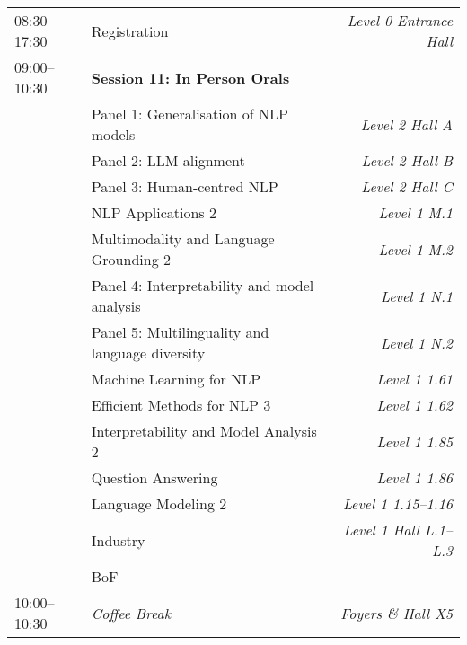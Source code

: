 \begin{xltabular}{\linewidth}{l X r}
    08:30--17:30    &   Registration    &   \textit{Level 0 Entrance Hall} \\
    
    09:00--10:30    &   \textbf{Session 11: In Person Orals} & \\
    &   Panel 1: Generalisation of NLP models   &   \textit{Level 2 Hall A} \\
    &   Panel 2: LLM alignment  &   \textit{Level 2 Hall B} \\
    &   Panel 3: Human-centred NLP  &   \textit{Level 2 Hall C} \\
    &   NLP Applications 2  &   \textit{Level 1 M.1} \\
    &   Multimodality and Language Grounding 2 &   \textit{Level 1 M.2} \\
    &   Panel 4: Interpretability and model analysis  &   \textit{Level 1 N.1} \\
    &   Panel 5: Multilinguality and language diversity  &   \textit{Level 1 N.2} \\
    &   Machine Learning for NLP  &   \textit{Level 1 1.61} \\
    &   Efficient Methods for NLP 3  &   \textit{Level 1 1.62} \\
    &   Interpretability and Model Analysis 2   &   \textit{Level 1 1.85} \\
    &   Question Answering   &   \textit{Level 1 1.86} \\
    &   Language Modeling 2   &   \textit{Level 1 1.15--1.16} \\
    &   Industry   &   \textit{Level 1 Hall L.1--L.3} \\
    &   BoF &   \\

    10:00--10:30    &   \textit{Coffee Break}    & \textit{Foyers \& Hall X5}  \\


\end{xltabular}
